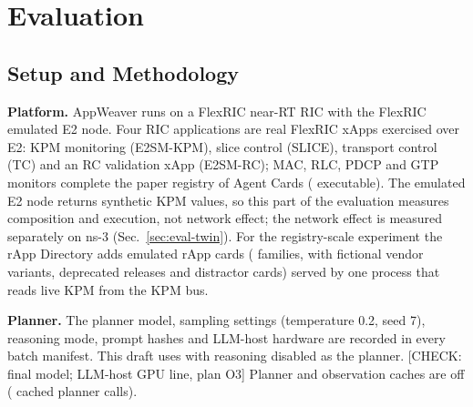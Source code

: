 %

\section{Evaluation}
\label{sec:evaluation}

\subsection{Setup and Methodology}
\label{sec:eval-setup}

\textbf{Platform.} AppWeaver runs on a FlexRIC near-RT RIC with the FlexRIC emulated E2 node. Four RIC applications are real FlexRIC xApps exercised over E2: KPM monitoring (E2SM-KPM),
slice control (SLICE), transport control (TC) and an RC validation xApp (E2SM-RC); MAC, RLC, PDCP and
GTP monitors complete the paper registry of  Agent Cards
( executable). The emulated E2 node returns synthetic KPM values, so this
part of the evaluation measures composition and execution, not network effect; the network effect is
measured separately on ns-3 (Sec.~\ref{sec:eval-twin}). For the registry-scale experiment the rApp
Directory adds  emulated rApp cards (
families, with fictional vendor variants, deprecated releases and distractor cards) served by one process that reads live KPM from the KPM bus.

\textbf{Planner.} The planner model, sampling settings (temperature 0.2, seed 7), reasoning mode,
prompt hashes and LLM-host hardware are recorded in every batch manifest. This draft uses
\texttt{} with reasoning disabled as the planner. [CHECK: final model; LLM-host
GPU line, plan O3] Planner and observation caches are off
( cached planner calls).


